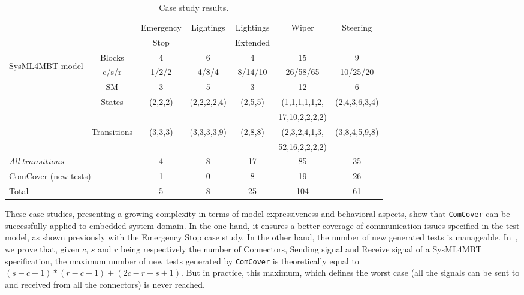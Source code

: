 \documentclass{llncs}
\begin{document}
\begin{table}[!h]
\centering
\vspace*{-.4cm}
\caption{Case study results.}
\footnotesize{
	\begin{tabular}{|c|c|c|c|c|c|c|}
    	\hline
    	& & Emergency & Lightings & Lightings & Wiper & Steering \\
    	& & Stop & & Extended & &
    	\\ \hline
    	\multirow{7}{*}{\begin{turn}{90}{\scriptsize SysML4MBT \newline
    	model}\end{turn}}
		& Blocks & 4 & 6 & 4 & 15 & 9 \\ \cline{2-7}
    	& c/s/r & 1/2/2 & 4/8/4 & 8/14/10 & 26/58/65 & 10/25/20
    	\\ \cline{2-7}
    	& SM & 3 & 5 & 3 & 12 & 6
    	\\ \cline{2-7}
    	& States & (2,2,2) & (2,2,2,2,4) & (2,5,5) & (1,1,1,1,1,2, & (2,4,3,6,3,4) 
    	\\
    	& & & & & 17,10,2,2,2,2) &
    	\\ \cline{2-7}
    	& Transitions & (3,3,3) & (3,3,3,3,9) & (2,8,8) &
    	(2,3,2,4,1,3, & (3,8,4,5,9,8)
    	\\
    	& & & & & 52,16,2,2,2,2)&
    	\\ \hline
    	\multicolumn{2}{|l|}{$All~transitions$} &
    	4 & 8 & 17 & 85 & 35
    	\\ \hline
    	\multicolumn{2}{|l|}{ComCover (new tests)} &
    	1 & 0 & 8 & 19 & 26
    	\\ \hline
    	\multicolumn{2}{|l|}{Total} &
    	5 & 8 & 25 & 104 & 61 
    	\\ \hline
	
        \end{tabular}
	\label{casestudies}
}
\vspace*{-.4cm}
\end{table}

These case studies, presenting a growing complexity in terms of
model expressiveness and behavioral aspects, show that
\texttt{ComCover} can be successfully applied to embedded system domain. In the one hand, it ensures a
better coverage of communication issues specified in the test model,
as shown previously with the Emergency Stop case study. In the other hand, the number of new generated tests 
is manageable. In~\cite{JLAThesis2012}, we prove that, given $c$, $s$
and $r$ being respectively the number of Connectors, Sending signal
and Receive signal of a SysML4MBT specification, the maximum
number of new tests generated by \texttt{ComCover} is theoretically
equal to $(s-c+1)*(r-c+1)+(2c-r-s+1)$. But in practice, this maximum,
which defines the worst case (all the signals can be sent to and
received from all the connectors) is never reached. 
\end{document}
